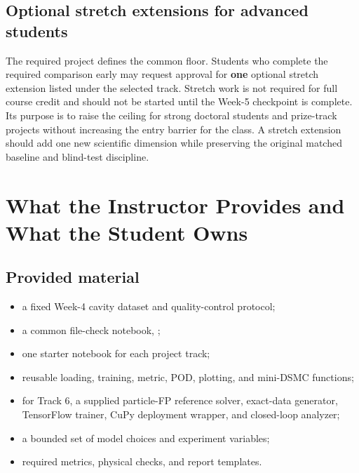 \documentclass[11pt]{article}
\newcommand{\file}[1]{\path{#1}}
\begin{document}
\subsection{Optional stretch extensions for advanced students}
The required project defines the common floor. Students who complete the required comparison early may request approval for \textbf{one} optional stretch extension listed under the selected track. Stretch work is not required for full course credit and should not be started until the Week-5 checkpoint is complete. Its purpose is to raise the ceiling for strong doctoral students and prize-track projects without increasing the entry barrier for the class. A stretch extension should add one new scientific dimension while preserving the original matched baseline and blind-test discipline.

\section{What the Instructor Provides and What the Student Owns}
\subsection{Provided material}
\begin{itemize}
\item a fixed Week-4 cavity dataset and quality-control protocol;
\item a common file-check notebook, \file{P0_Project_Setup.ipynb};
\item one starter notebook for each project track;
\item reusable loading, training, metric, POD, plotting, and mini-DSMC functions;
\item for Track 6, a supplied particle-FP reference solver, exact-data generator, TensorFlow trainer, CuPy deployment wrapper, and closed-loop analyzer;
\item a bounded set of model choices and experiment variables;
\item required metrics, physical checks, and report templates.
\end{itemize}
\end{document}
